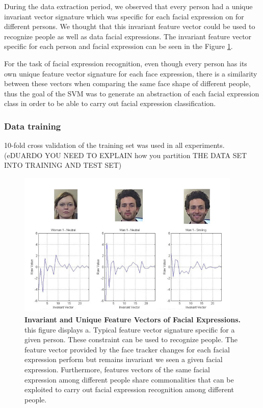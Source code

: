 \documentclass[]{article}
\begin{document}
During the data extraction period, we observed that every person had a unique invariant vector signature which was
specific for each facial expression on for different persons. We thought that this invariant feature vector could be
used to recognize people as well as data facial expressions. The invariant feature vector specific for each person and
facial expression can be seen in the Figure \ref{comparationBetweenFaces}.

For the task of facial expression recognition, even though every person has its own unique feature vector signature for
each face expression, there is a similarity between these vectors when comparing the same face shape of different
people, thus the goal of the SVM was to generate an abstraction of each facial expression class in order to be able to
carry out facial expression classification.

\subsubsection{Data training}
10-fold cross validation of the training set was used in all experiments. 
(eDUARDO YOU NEED TO EXPLAIN how you partition THE DATA SET INTO TRAINING AND TEST SET)

\begin{figure}[ht]
\begin{center}
\vspace{-3mm}
\includegraphics[width=0.95\textwidth,height=70mm]{figures/comparationBetweenFaces.jpg}
\end{center}
\caption{\textbf{Invariant and Unique Feature Vectors of Facial Expressions.} this figure displays a. Typical feature 
vector signature specific for a given person. These constraint can be used to recognize people. The feature vector
provided by the face tracker changes for each facial expression perform but remains invariant we seen a given facial 
expression. Furthermore, features vectors of the same facial expression among different people share commonalities that
can be exploited to carry out facial expression recognition among different people.}
\label{comparationBetweenFaces}
\end{figure}
\end{document}

